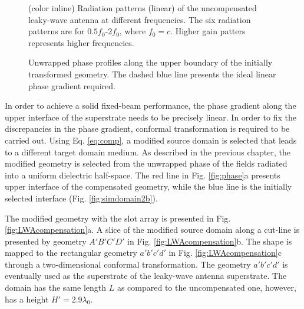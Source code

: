\begin{figure} [t]
  \begin{center}
 
 \end{center}
  \caption[Radiation patterns of the uncompensated leaky-wave antenna at different frequencies.]{(color inline) Radiation patterns (linear) of the uncompensated leaky-wave antenna at different frequencies. The six radiation patterns are for $0.5f_0$-$2f_0$, where $f_0=c$. Higher gain patters represents higher frequencies.}
\label{fig:cornergeneral_uncomp}
\end{figure}
%
\begin{figure} [t]
  \begin{center}
 
 \end{center}
  \caption[Unwrapped phase profiles along the upper boundary of the uncompensated geometry in the target domain.]{Unwrapped phase profiles along the upper boundary of the initially transformed geometry. The dashed blue line presents the ideal linear phase gradient required.}
\label{fig:phaseini}
\end{figure}

In order to achieve a solid fixed-beam performance, the phase gradient along the upper interface of the superstrate needs to be precisely linear. In order to fix the discrepancies in the phase gradient, conformal transformation is required to be carried out. Using Eq. \ref{eq:comp}, a modified source domain is selected that leads to a different target domain medium. As described in the previous chapter, the modified geometry is selected from the unwrapped phase of the fields radiated into a uniform dielectric half-space. The red line in Fig. \ref{fig:phase}a presents upper interface of the compensated geometry, while the blue line is the initially selected interface (Fig. \ref{fig:simdomain2b}). 

The modified geometry with the slot array is presented in Fig. \ref{fig:LWAcompensation}a. A slice of the modified source domain along a cut-line is presented by geometry $A'B'C'D'$ in Fig. \ref{fig:LWAcompensation}b. The shape is mapped to the rectangular geometry $a'b'c'd'$ in Fig. \ref{fig:LWAcompensation}c through a two-dimensional conformal transformation. The geometry $a'b'c'd'$ is eventually used as the superstrate of the leaky-wave antenna superstrate. The domain has the same length $L$ as compared to the uncompensated one, however, has a height $H' = 2.9 \lambda_0$. 




